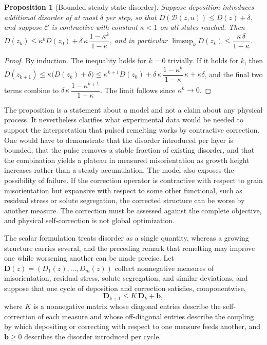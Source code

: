 \documentclass[11pt]{article}
\newtheorem{proposition}{Proposition}
\theoremstyle{definition}
\begin{document}
\begin{proposition}[Bounded steady-state disorder]
\label{prop:contraction}
Suppose deposition introduces additional disorder of at most $\delta$ per step, so that $D(\mathcal{D}(z,u))\le D(z)+\delta$, and suppose $\mathcal{C}$ is contractive with constant $\kappa<1$ on all states reached. Then $D(z_k)\le \kappa^k D(z_0)+\delta\,\kappa\,\dfrac{1-\kappa^k}{1-\kappa}$, and in particular $\limsup_k D(z_k)\le \dfrac{\kappa\,\delta}{1-\kappa}$.
\end{proposition}

\begin{proof}
By induction. The inequality holds for $k=0$ trivially. If it holds for $k$, then $D(z_{k+1})\le\kappa\bigl(D(z_k)+\delta\bigr)\le \kappa^{k+1}D(z_0)+\delta\,\kappa\,\dfrac{1-\kappa^{k}}{1-\kappa}\,\kappa+\kappa\delta$, and the final two terms combine to $\delta\,\kappa\,\dfrac{1-\kappa^{k+1}}{1-\kappa}$. The limit follows since $\kappa^k\to0$. \qedhere
\end{proof}

The proposition is a statement about a model and not a claim about any physical process. It nevertheless clarifies what experimental data would be needed to support the interpretation that pulsed remelting works by contractive correction. One would have to demonstrate that the disorder introduced per layer is bounded, that the pulse removes a stable fraction of existing disorder, and that the combination yields a plateau in measured misorientation as growth height increases rather than a steady accumulation. The model also exposes the possibility of failure. If the correction operator is contractive with respect to grain misorientation but expansive with respect to some other functional, such as residual stress or solute segregation, the corrected structure can be worse by another measure. The correction must be assessed against the complete objective, and physical self-correction is not global optimization.

The scalar formulation treats disorder as a single quantity, whereas a growing structure carries several, and the preceding remark that remelting may improve one while worsening another can be made precise. Let $\mathbf{D}(z)=(D_1(z),\ldots,D_m(z))$ collect nonnegative measures of misorientation, residual stress, solute segregation, and similar deviations, and suppose that one cycle of deposition and correction satisfies, componentwise,
\begin{equation}
\mathbf{D}_{k+1}\le K\,\mathbf{D}_k+\mathbf{b},
\label{eq:coupled}
\end{equation}
where $K$ is a nonnegative matrix whose diagonal entries describe the self-correction of each measure and whose off-diagonal entries describe the coupling by which depositing or correcting with respect to one measure feeds another, and $\mathbf{b}\ge 0$ describes the disorder introduced per cycle.
\end{document}

